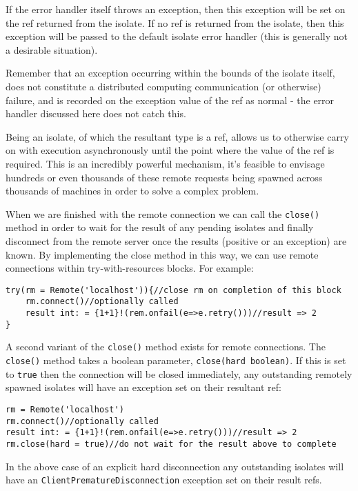 \documentclass[conc-doc]{subfiles}
\begin{document}
If the error handler itself throws an exception, then this exception will be set on the ref returned from the isolate. If no ref is returned from the isolate, then this exception will be passed to the default isolate error handler (this is generally not a desirable situation).

Remember that an exception occurring within the bounds of the isolate itself, does not constitute a distributed computing communication (or otherwise) failure, and is recorded on the exception value of the ref as normal - the error handler discussed here does not catch this.

Being an isolate, of which the resultant type is a ref, allows us to otherwise carry on with execution asynchronously until the point where the value of the ref is required. This is an incredibly powerful mechanism, it's feasible to envisage hundreds or even thousands of these remote requests being spawned across thousands of machines in order to solve a complex problem.

When we are finished with the remote connection we can call the \lstinline{close()} method in order to wait for the result of any pending isolates and finally disconnect from the remote server once the results (positive or an exception) are known. By implementing the close method in this way, we can use remote connections within try-with-resources blocks. For example:

\begin{lstlisting}
try(rm = Remote('localhost')){//close rm on completion of this block
	rm.connect()//optionally called
	result int: = {1+1}!(rem.onfail(e=>e.retry()))//result => 2
}
\end{lstlisting}

A second variant of the \lstinline{close()} method exists for remote connections. The \lstinline{close()} method takes a boolean parameter, \lstinline{close(hard boolean)}. If this is set to \lstinline{true} then the connection will be closed immediately, any outstanding remotely spawned isolates will have an exception set on their resultant ref:

\begin{lstlisting}
rm = Remote('localhost')
rm.connect()//optionally called
result int: = {1+1}!(rem.onfail(e=>e.retry()))//result => 2
rm.close(hard = true)//do not wait for the result above to complete
\end{lstlisting}

In the above case of an explicit hard disconnection any outstanding isolates will have an \lstinline{ClientPrematureDisconnection} exception set on their result refs.
\end{document}
